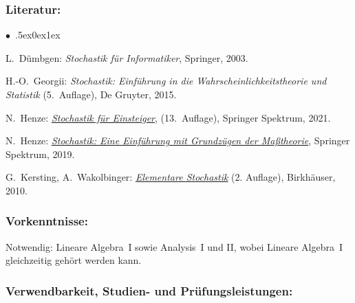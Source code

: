 \documentclass[a4paper,10pt]{article}
\renewenvironment{itemize}{\begin{list}{$\bullet$\ }{\itemsep.5ex\setlength{\topsep}{0.5\itemsep}\parsep0ex\labelsep1ex\settowidth{\labelwidth}{$\bullet$\ }\setlength{\leftmargin}{\labelwidth}\addtolength{\leftmargin}{3ex}\addtolength{\leftmargin}{\labelsep}}}{\end{list}}
\begin{document}
\subsubsection*{\large
    Literatur:
}
\begin{itemize}
\item L.~Dümbgen: \emph{Stochastik für Informatiker}, Springer, 2003.
\item H.-O.~Georgii: \emph{Stochastik: Einführung in die Wahrscheinlichkeitstheorie und Statistik} (5.~Auf\/lage), De Gruyter, 2015.
\item N.~Henze: \href{https://www.redi-bw.de/start/unifr/EBooks-springer/10.1007/978-3-662-63840-8}{\emph{Stochastik für Einsteiger}}, (13.~Auf\/lage), Springer Spektrum, 2021. 
\item  N.~Henze: \href{https://www.redi-bw.de/start/unifr/EBooks-springer/10.1007/978-3-662-59563-3}{\emph{Stochastik: Eine Einführung mit Grundzügen der Maßtheorie}}, Springer Spektrum, 2019. 
\item  G.~Kersting, A.~Wakolbinger: \href{http://www.redi-bw.de/start/unifr/EBooks-springer/10.1007/978-3-0346-0414-7}{\emph{Elementare Stochastik}} (2. Auf\/lage), Birkhäuser, 2010. 
\end{itemize}
\subsubsection*{\large
    Vorkenntnisse:
}
Notwendig: Lineare Algebra~I sowie Analysis~I und II, wobei Lineare Algebra~I gleichzeitig gehört werden kann.
\cleardoublepage
\subsubsection*{\large
    Verwendbarkeit, Studien- und Prüfungsleistungen:
}
\end{document}
